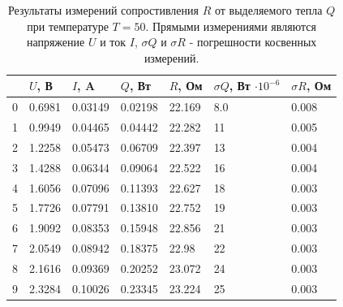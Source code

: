 \documentclass[12pt]{article}
\begin{document}
\begin{table}[H]
    \centering
    \begin{tabular}{|l|l|l|l|l|l|l|}
        \hline
          & $U$, В & $I$, A  & $Q$, Вт & $R$, Ом & $\sigma Q$, Вт $\cdot 10^{-6}$ & $\sigma R$, Ом \\
        \hline
        0 & 0.6981 & 0.03149 & 0.02198 & 22.169  & 8.0                            & 0.008          \\
        1 & 0.9949 & 0.04465 & 0.04442 & 22.282  & 11                             & 0.005          \\
        2 & 1.2258 & 0.05473 & 0.06709 & 22.397  & 13                             & 0.004          \\
        3 & 1.4288 & 0.06344 & 0.09064 & 22.522  & 16                             & 0.004          \\
        4 & 1.6056 & 0.07096 & 0.11393 & 22.627  & 18                             & 0.003          \\
        5 & 1.7726 & 0.07791 & 0.13810 & 22.752  & 19                             & 0.003          \\
        6 & 1.9092 & 0.08353 & 0.15948 & 22.856  & 21                             & 0.003          \\
        7 & 2.0549 & 0.08942 & 0.18375 & 22.98   & 22                             & 0.003          \\
        8 & 2.1616 & 0.09369 & 0.20252 & 23.072  & 24                             & 0.003          \\
        9 & 2.3284 & 0.10026 & 0.23345 & 23.224  & 25                             & 0.003          \\
        \hline
    \end{tabular}
    
    \caption{Результаты измерений сопростивления \(R\) от выделяемого тепла \(Q\) при температуре \(T = 50\)\textcelsius.
        Прямыми измерениями являются напряжение \(U\) и ток \(I\), \(\sigma Q\) и \(\sigma R\) - погрешности косвенных измерений.}
    \label{tab:4}
\end{table}
\end{document}
